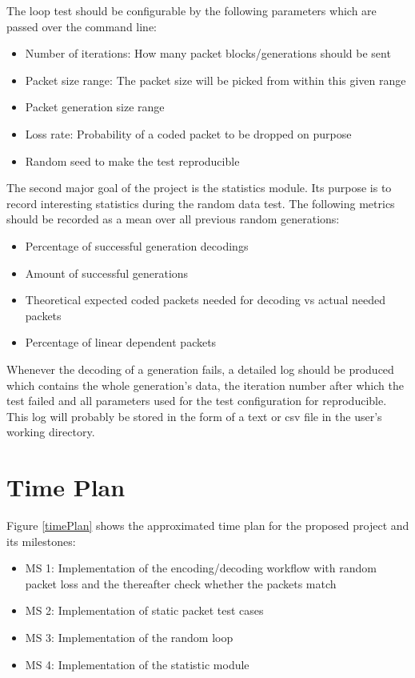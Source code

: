\documentclass[a4paper,english,10pt]{tumarticle}
\begin{document}
The loop test should be configurable by the following parameters which are passed over the command
line:
\begin{itemize}
    \setlength{\itemsep}{1pt}
	\setlength{\parskip}{0pt}
	\setlength{\parsep}{0pt}
    \item Number of iterations: How many packet blocks/generations should be sent
    \item Packet size range: The packet size will be picked from within this given range
    \item Packet generation size range
    \item Loss rate: Probability of a coded packet to be dropped on purpose
    \item Random seed to make the test reproducible
\end{itemize}

The second major goal of the project is the statistics module. Its purpose is to record interesting
statistics during the random data test. The following metrics should be recorded as a mean over all
previous random generations:
\begin{itemize}
    \setlength{\itemsep}{1pt}
	\setlength{\parskip}{0pt}
	\setlength{\parsep}{0pt}
    \item Percentage of successful generation decodings
    \item Amount of successful generations
    \item Theoretical expected coded packets needed for decoding vs actual needed packets
    \item Percentage of linear dependent packets
\end{itemize}
Whenever the decoding of a generation fails, a detailed log should be produced which contains the
whole generation's data, the iteration number after which the test failed and all parameters used
for the test configuration for reproducible. This log will probably be stored in the form of a text
or csv file in the user's working directory.

\section{Time Plan}

Figure \ref{timePlan} shows the approximated time plan for the proposed project and its milestones:
\begin{itemize}
    \setlength{\itemsep}{1pt}
	\setlength{\parskip}{0pt}
	\setlength{\parsep}{0pt}
    \item MS 1: Implementation of the encoding/decoding workflow with random packet loss and the
    thereafter check whether the packets match
    \item MS 2: Implementation of static packet test cases
    \item MS 3: Implementation of the random loop
    \item MS 4: Implementation of the statistic module
\end{itemize}
\end{document}
